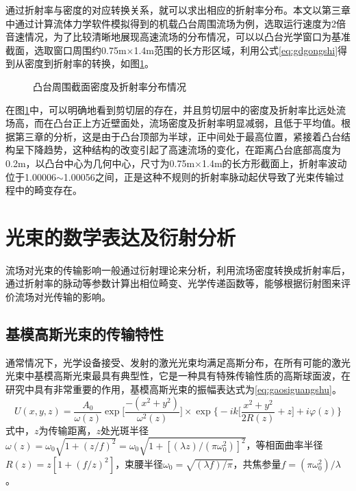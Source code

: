 通过折射率与密度的对应转换关系，就可以求出相应的折射率分布。本文以第三章中通过计算流体力学软件模拟得到的机载凸台周围流场为例，选取运行速度为2倍音速情况，为了比较清晰地展现高速流场的分布情况，可以以凸台光学窗口为基准截面，选取窗口周围约0.75m$\times$1.4m范围的长方形区域，利用公式\eqref{eq:gdgongshi}得到从密度到折射率的转换，如图\ref{fig:midudaozheshelv}。
\begin{figure}[bhtp]
\centering
{}
\caption{凸台周围截面密度及折射率分布情况}
\label{fig:midudaozheshelv}
\end{figure}

在图\ref{fig:midudaozheshelv}中，可以明确地看到剪切层的存在，并且剪切层中的密度及折射率比远处流场高，而在凸台正上方近壁面处，流场密度及折射率明显减弱，且低于平均值。根据第三章的分析，这是由于凸台顶部为半球，正中间处于最高位置，紧接着凸台结构呈下降趋势，这种结构的改变引起了高速流场的变化，在距离凸台底部高度为0.2m，以凸台中心为几何中心，尺寸为0.75m$\times$1.4m的长方形截面上，折射率波动位于1.00006$\sim$1.00056之间，正是这种不规则的折射率脉动起伏导致了光束传输过程中的畸变存在。
\section{光束的数学表达及衍射分析}
流场对光束的传输影响一般通过衍射理论来分析，利用流场密度转换成折射率后，通过折射率的脉动等参数计算出相位畸变、光学传递函数等，能够根据衍射图来评价流场对光传输的影响。
\subsection{基模高斯光束的传输特性}
通常情况下，光学设备接受、发射的激光光束均满足高斯分布，在所有可能的激光光束中基模高斯光束最具有典型性，它是一种具有特殊传输性质的高斯球面波，在研究中具有非常重要的作用，基模高斯光束的振幅表达式为\eqref{eq:gaosiguangshu}。
\begin{equation}
U(x,y,z)=\frac{A_0}{\omega(z)}\exp\big[\frac{-(x^2+y^2)}{\omega^2(z)}\big]\times\exp\big\{-ik\big[\frac{x^2+y^2}{2R(z)}+z\big]+i\varphi(z)\big\}
\label{eq:gaosiguangshu}
\end{equation}
式中，$z$为传输距离，$z$处光斑半径$\omega(z)=\omega_0\sqrt{1+(z/f)^2}=\omega_0\sqrt{1+[(\lambda z)/(\pi\omega_0^2)]^2}$，等相面曲率半径$R(z)=z[1+(f/z)^2]$，束腰半径$\omega_0=\sqrt{(\lambda f)/\pi}$，共焦参量$f=(\pi\omega_0^2)/\lambda$。

